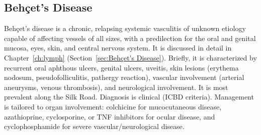 


\label{sec:Variable Vessel Vasculitis}

\subsection{Behçet's Disease}
\label{sec:Behçet's Disease (Connective Tissue)}
Behçet's disease is a chronic, relapsing systemic vasculitis of unknown etiology capable of affecting vessels of all sizes, with a predilection for the oral and genital mucosa, eyes, skin, and central nervous system. It is discussed in detail in Chapter~\ref{ch:lymph} (Section~\ref{sec:Behçet's Disease}). Briefly, it is characterized by recurrent oral aphthous ulcers, genital ulcers, uveitis, skin lesions (erythema nodosum, pseudofolliculitis, pathergy reaction), vascular involvement (arterial aneurysms, venous thrombosis), and neurological involvement. It is most prevalent along the Silk Road. Diagnosis is clinical (ICBD criteria). Management is tailored to organ involvement: colchicine for mucocutaneous disease, azathioprine, cyclosporine, or TNF inhibitors for ocular disease, and cyclophosphamide for severe vascular/neurological disease.


